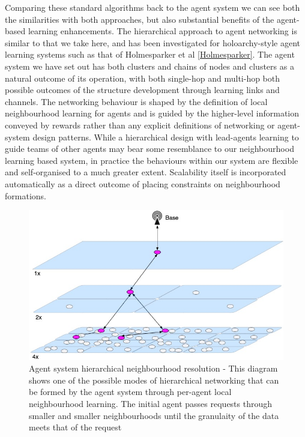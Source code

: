 Comparing these standard algorithms back to the agent system we can see both the similarities with both approaches, but also substantial benefits of the agent-based learning enhancements. The hierarchical approach to agent networking is similar to that we take here, and has been investigated for holoarchy-style agent learning systems such as that of Holmesparker et al \ref{Holmesparker}. The agent system we have set out has both clusters and chains of nodes and clusters as a natural outcome of its operation, with both single-hop and multi-hop both possible outcomes of the structure development through learning links and channels. The networking behaviour is shaped by the definition of local neighbourhood learning for agents and is guided by the higher-level information conveyed by rewards rather than any explicit definitions of networking or agent-system design patterns. While a hierarchical design with lead-agents learning to guide teams of other agents may bear some resemblance to our neighbourhood learning based system, in practice the behaviours within our system are flexible and self-organised to a much greater extent. Scalability itself is incorporated automatically as a direct outcome of placing constraints on neighbourhood formations.
\newline
\newline
\begin{figure}
	\centering
	\includegraphics[width=0.7\linewidth]{WSN_hierarchical_resolution}
	\caption{Agent system hierarchical neighbourhood resolution - This diagram shows one of the possible modes of hierarchical networking that can be formed by the agent system through per-agent local neighbourhood learning. The initial agent passes requests through smaller and smaller neighbourhoods until the granulaity of the data meets that of the request}
	\label{fig:wsnhierarchicalresolution}
\end{figure}
